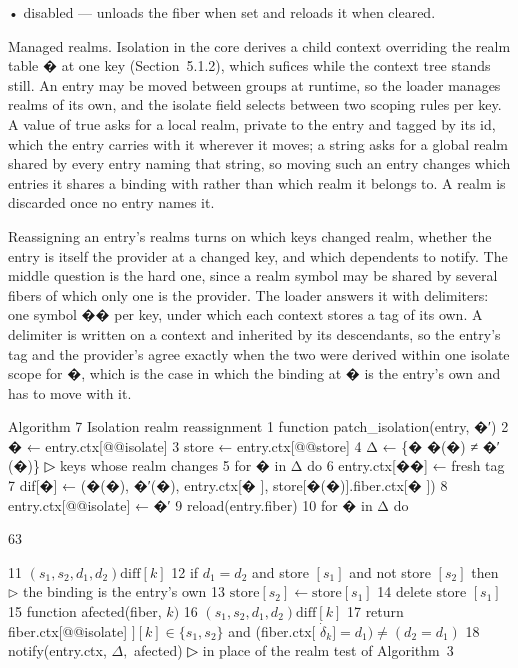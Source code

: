 \documentclass[
  10
]{article}
\begin{document}
• disabled --- unloads the fiber when set and reloads it when cleared.

Managed realms. Isolation in the core derives a child context overriding
the realm table � at one key (Section~5.1.2), which sufices while the
context tree stands still. An entry may be moved between groups at
runtime, so the loader manages realms of its own, and the isolate field
selects between two scoping rules per key. A value of true asks for a
local realm, private to the entry and tagged by its id, which the entry
carries with it wherever it moves; a string asks for a global realm
shared by every entry naming that string, so moving such an entry
changes which entries it shares a binding with rather than which realm
it belongs to. A realm is discarded once no entry names it.

Reassigning an entry's realms turns on which keys changed realm, whether
the entry is itself the provider at a changed key, and which dependents
to notify. The middle question is the hard one, since a realm symbol may
be shared by several fibers of which only one is the provider. The
loader answers it with delimiters: one symbol �� per key, under which
each context stores a tag of its own. A delimiter is written on a
context and inherited by its descendants, so the entry's tag and the
provider's agree exactly when the two were derived within one isolate
scope for �, which is the case in which the binding at � is the entry's
own and has to move with it.

Algorithm 7 Isolation realm reassignment 1 function
patch\_isolation(entry, �′) 2 � ← entry.ctx{[}@@isolate{]} 3 store ←
entry.ctx{[}@@store{]} 4 Δ ← \{� \textbar{} �(�) ≠ �′(�)\} ▷ keys whose
realm changes 5 for � in Δ do 6 entry.ctx{[}��{]} ← fresh tag 7
dif{[}�{]} ← (�(�), �′(�), entry.ctx{[}� {]},
store{[}�(�){]}.fiber.ctx{[}� {]}) 8 entry.ctx{[}@@isolate{]} ← �′ 9
reload(entry.fiber) 10 for � in Δ do

63

11
\(( s _ { 1 } , s _ { 2 } , d _ { 1 } , d _ { 2 } )  \mathrm { d i f f } [ k ]\)
12 if \(d _ { 1 } = d _ { 2 }\) and store \(\left[ s _ { 1 } \right]\)
and not store \(\left[ s _ { 2 } \right]\) then \(\triangleright\) the
binding is the entry's own 13
\(\mathrm { s t o r e } [ s _ { 2 } ] \gets \mathrm { s t o r e } [ s _ { 1 } ]\)
14 delete store \(\left[ s _ { 1 } \right]\) 15 function afected(fiber,
\(k )\) 16
\(( s _ { 1 } , s _ { 2 } , d _ { 1 } , d _ { 2 } )  \mathrm { d i f f } [ k ]\)
17 return fiber.ctx{[}@@isolate{]}
\(] [ k ] \in \{ s _ { 1 } , s _ { 2 } \}\) and (fiber.ctx{[}
\(\dot { \delta } _ { k } ] = d _ { 1 } ) \neq ( d _ { 2 } = d _ { 1 } )\)
18 notify(entry.ctx, \(\Delta ,\) afected) ▷ in place of the realm test
of Algorithm~3
\end{document}
